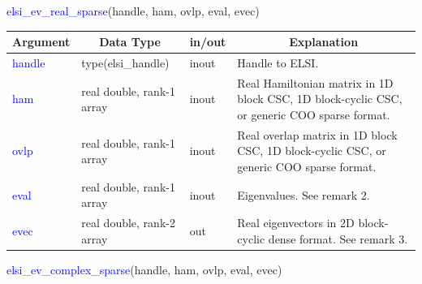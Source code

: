 \documentclass{report}
\begin{document}
\begin{labeling}{\hspace{6cm}}
\item [\hspace{0.3cm} \textcolor{blue}{elsi\_ev\_real\_sparse}(handle, ham, ovlp, eval, evec)]
\end{labeling}

\begin{table}[h]
\centering
\begin{tabular}[]{|p{20mm}|p{45mm}|p{15mm}|p{85mm}|}
\hline
\multicolumn{1}{|c|}{\textbf{Argument}} & \multicolumn{1}{c|}{\textbf{Data Type}} & \multicolumn{1}{c|}{\textbf{in/out}} & \multicolumn{1}{c|}{\textbf{Explanation}}\\
\hline
\textcolor{blue}{handle} & type(elsi\_handle)        & inout & Handle to ELSI.\\
\hline
\textcolor{blue}{ham}    & real double, rank-1 array & inout & Real Hamiltonian matrix in 1D block CSC, 1D block-cyclic CSC, or generic COO sparse format.\\
\hline
\textcolor{blue}{ovlp}   & real double, rank-1 array & inout & Real overlap matrix in 1D block CSC, 1D block-cyclic CSC, or generic COO sparse format.\\
\hline
\textcolor{blue}{eval}   & real double, rank-1 array & inout & Eigenvalues. See remark 2.\\
\hline
\textcolor{blue}{evec}   & real double, rank-2 array & out   & Real eigenvectors in 2D block-cyclic dense format. See remark 3.\\
\hline
\end{tabular}
\end{table}

\begin{labeling}{\hspace{6cm}}
\item [\hspace{0.3cm} \textcolor{blue}{elsi\_ev\_complex\_sparse}(handle, ham, ovlp, eval, evec)]
\end{labeling}
\end{document}
